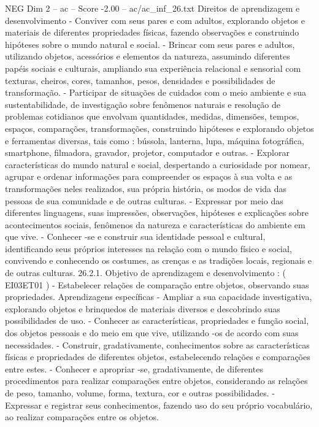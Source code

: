 \begin{textsample}{NEG Dim 2 – ac – Score -2.00 – ac/ac\_inf\_26.txt}
Direitos de aprendizagem e desenvolvimento - Conviver com seus pares e com adultos, explorando objetos e materiais de diferentes propriedades físicas, fazendo observações e construindo hipóteses sobre o mundo natural e social. - Brincar com seus pares e adultos, utilizando objetos, acessórios e elementos da natureza, assumindo diferentes papéis sociais e culturais, ampliando sua experiência relacional e sensorial com texturas, cheiros, cores, tamanhos, pesos, densidades e possibilidades de transformação. - Participar de situações de cuidados com o meio ambiente e sua sustentabilidade, de investigação sobre fenômenos naturais e resolução de problemas cotidianos que envolvam quantidades, medidas, dimensões, tempos, espaços, comparações, transformações, construindo hipóteses e explorando objetos e ferramentas diversas, tais como : bússola, lanterna, lupa, máquina fotográfica, smartphone, filmadora, gravador, projetor, computador e outras. - Explorar características do mundo natural e social, despertando a curiosidade por nomear, agrupar e ordenar informações para compreender os espaços à sua volta e as transformações neles realizados, sua própria história, os modos de vida das pessoas de sua comunidade e de outras culturas. - Expressar por meio das diferentes linguagens, suas impressões, observações, hipóteses e explicações sobre acontecimentos sociais, fenômenos da natureza e características do ambiente em que vive. - Conhecer -se e construir sua identidade pessoal e cultural, identificando seus próprios interesses na relação com o mundo físico e social, convivendo e conhecendo os costumes, as crenças e as tradições locais, regionais e de outras culturas. 26.2.1.
Objetivo de aprendizagem e desenvolvimento : ( EI03ET01 ) - Estabelecer relações de comparação entre objetos, observando suas propriedades.
Aprendizagens específicas - Ampliar a sua capacidade investigativa, explorando objetos e brinquedos de materiais diversos e descobrindo suas possibilidades de uso. - Conhecer as características, propriedades e função social, dos objetos pessoais e do meio em que vive, utilizando -os de acordo com suas necessidades. - Construir, gradativamente, conhecimentos sobre as características físicas e propriedades de diferentes objetos, estabelecendo relações e comparações entre estes. - Conhecer e apropriar -se, gradativamente, de diferentes procedimentos para realizar comparações entre objetos, considerando as relações de peso, tamanho, volume, forma, textura, cor e outras possibilidades. - Expressar e registrar seus conhecimentos, fazendo uso do seu próprio vocabulário, ao realizar comparações entre os objetos.

\end{textsample}
